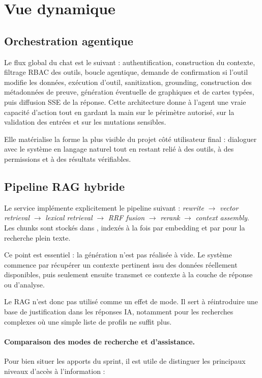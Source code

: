 \section{Vue dynamique}

\subsection{Orchestration agentique}
Le flux global du chat est le suivant : authentification, construction du contexte, filtrage RBAC des outils, boucle agentique, demande de confirmation si l'outil modifie les données, exécution d'outil, sanitization, grounding, construction des métadonnées de preuve, génération éventuelle de graphiques et de cartes typées, puis diffusion SSE de la réponse. Cette architecture donne à l'agent une vraie capacité d'action tout en gardant la main sur le périmètre autorisé, sur la validation des entrées et sur les mutations sensibles.

Elle matérialise la forme la plus visible du projet côté utilisateur final : dialoguer avec le système en langage naturel tout en restant relié à des outils, à des permissions et à des résultats vérifiables.

\subsection{Pipeline RAG hybride}
Le service  implémente explicitement le pipeline suivant : \textit{rewrite} $\rightarrow$ \textit{vector retrieval} $\rightarrow$ \textit{lexical retrieval} $\rightarrow$ \textit{RRF fusion} $\rightarrow$ \textit{rerank} $\rightarrow$ \textit{context assembly}. Les chunks sont stockés dans , indexés à la fois par embedding et par  pour la recherche plein texte.

Ce point est essentiel : la génération n'est pas réalisée à vide. Le système commence par récupérer un contexte pertinent issu des données réellement disponibles, puis seulement ensuite transmet ce contexte à la couche de réponse ou d'analyse.

Le RAG n'est donc pas utilisé comme un effet de mode. Il sert à réintroduire une base de justification dans les réponses IA, notamment pour les recherches complexes où une simple liste de profils ne suffit plus.
\paragraph{Comparaison des modes de recherche et d'assistance.}
Pour bien situer les apports du sprint, il est utile de distinguer les principaux niveaux d'accès à l'information :

